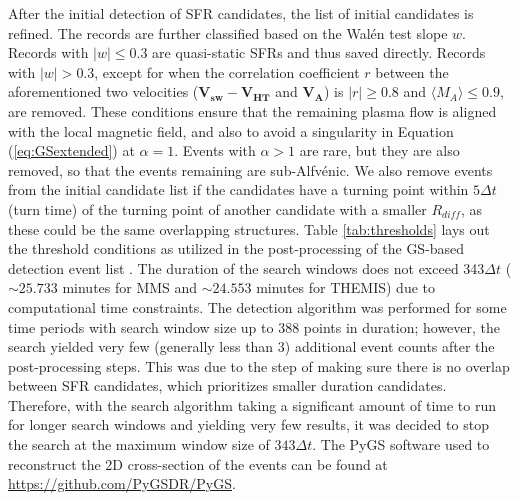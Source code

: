 After the initial detection of SFR candidates, the list of initial candidates is refined. The records are further classified based on the Wal\'en test slope $w$. Records with $|w|\leq0.3$ are quasi-static SFRs and thus saved directly. Records with $|w|>0.3$, except for when the correlation coefficient $r$ between the aforementioned two velocities ($\mathbf{V_{sw}} - \mathbf{V_{HT}}$ and $\mathbf{V_A}$) is $|r|\geq 0.8$ and $\langle M_A\rangle \leq 0.9$, are removed. These conditions ensure that the remaining plasma flow is aligned with the local magnetic field, and also to avoid a singularity in Equation (\ref{eq:GSextended}) at $\alpha=1$. Events with $\alpha>1$ are rare, but they are also removed, so that the events remaining are sub-Alfv\'enic. We also remove events from the initial candidate list if the candidates have a turning point within $5\Delta t$ (turn time) of the turning point of another candidate with a smaller $R_{diff}$, as these could be the same overlapping structures. Table \ref{tab:thresholds} lays out the threshold conditions as utilized in the post-processing of the GS-based detection event list \cite{Chen:2020, Chen:2021, Chen:2022}. The duration of the search windows does not exceed 343$\Delta t$ ($\sim 25.733$ minutes for MMS and $\sim 24.553$ minutes for THEMIS) due to computational time constraints. The detection algorithm was performed for some time periods with search window size up to 388 points in duration; however, the search yielded very few (generally less than 3) additional event counts after the post-processing steps. This was due to the step of making sure there is no overlap between SFR candidates, which prioritizes smaller duration candidates. Therefore, with the search algorithm taking a significant amount of time to run for longer search windows and yielding very few results, it was decided to stop the search at the maximum window size of $343\Delta t$. The PyGS software used to reconstruct the 2D cross-section of the events can be found at \url{https://github.com/PyGSDR/PyGS}.


